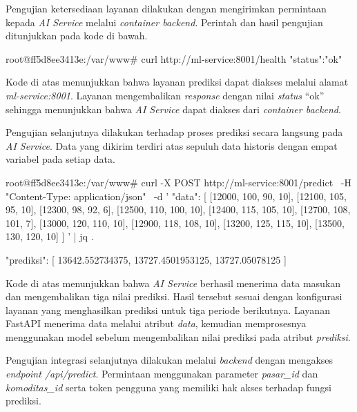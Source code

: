 Pengujian ketersediaan layanan dilakukan dengan mengirimkan permintaan kepada \textit{AI Service} melalui \textit{container backend}. Perintah dan hasil pengujian ditunjukkan pada kode di bawah.

\begin{code}
\begin{ignasicblock}
root@ff5d8ee3413e:/var/www# curl http://ml-service:8001/health
{"status":"ok"}
\end{ignasicblock}
\end{code}

Kode di atas menunjukkan bahwa layanan prediksi dapat diakses melalui alamat \textit{ml-service:8001}. Layanan mengembalikan \textit{response} dengan nilai \textit{status} ``ok'' sehingga menunjukkan bahwa \textit{AI Service} dapat diakses dari \textit{container backend}.

Pengujian selanjutnya dilakukan terhadap proses prediksi secara langsung pada \textit{AI Service}. Data yang dikirim terdiri atas sepuluh data historis dengan empat variabel pada setiap data.

\begin{code}
\begin{ignasicblock}
root@ff5d8ee3413e:/var/www# curl -X POST http://ml-service:8001/predict \
-H "Content-Type: application/json" \
-d '{
  "data": [
    [12000, 100, 90, 10],
    [12100, 105, 95, 10],
    [12300, 98, 92, 6],
    [12500, 110, 100, 10],
    [12400, 115, 105, 10],
    [12700, 108, 101, 7],
    [13000, 120, 110, 10],
    [12900, 118, 108, 10],
    [13200, 125, 115, 10],
    [13500, 130, 120, 10]
  ]
}' | jq .

{
  "prediksi": [
    13642.552734375,
    13727.4501953125,
    13727.05078125
  ]
}
\end{ignasicblock}
\end{code}

Kode di atas menunjukkan bahwa \textit{AI Service} berhasil menerima data masukan dan mengembalikan tiga nilai prediksi. Hasil tersebut sesuai dengan konfigurasi layanan yang menghasilkan prediksi untuk tiga periode berikutnya. Layanan FastAPI menerima data melalui atribut \textit{data}, kemudian memprosesnya menggunakan model sebelum mengembalikan nilai prediksi pada atribut \textit{prediksi}.

Pengujian integrasi selanjutnya dilakukan melalui \textit{backend} dengan mengakses \textit{endpoint /api/predict}. Permintaan menggunakan parameter \textit{pasar\_id} dan \textit{komoditas\_id} serta token pengguna yang memiliki hak akses terhadap fungsi prediksi.

